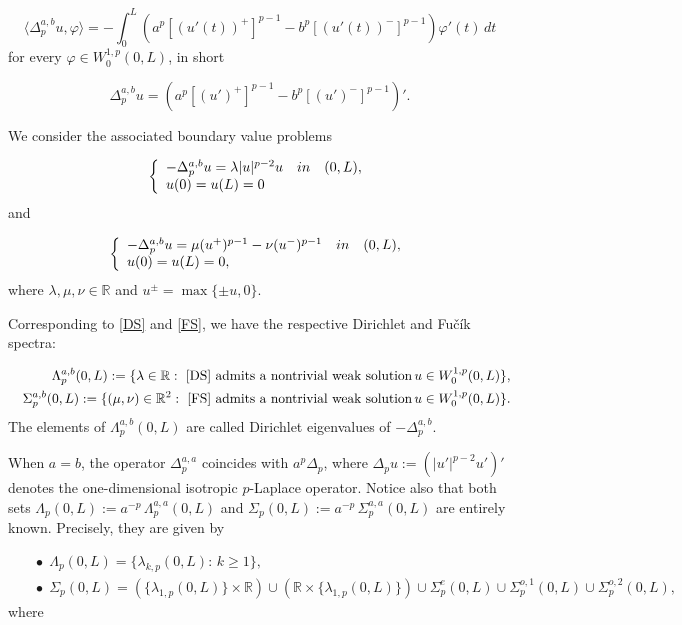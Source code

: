 \documentclass[a4paper,11pt]{article}
\newcommand{\R}{\mathbb{R}}
\begin{document}
{\[
\langle \Delta^{a,b}_p u, \varphi \rangle = - \int_0^L \left(a^{p}[(u'(t))^{+}]^{p-1}-b^{p}[(u'(t))^{-}]^{p-1}\right) \varphi'(t)\, dt
\]
for every $\varphi \in W_0^{1,p}(0,L)$, in short

\[
\Delta^{a,b}_p u = \left(a^{p}[(u')^{+}]^{p-1}-b^{p}[(u')^{-}]^{p-1}\right)'.
\]

We consider the associated boundary value problems

\begin{equation} \label{DS}
\left\{
\begin{array}{lllllrlllr}
- \Delta^{a,b}_p u = \lambda \vert u \vert^{p-2} u & {\rm in} & (0, L), \\
u(0) = u(L) = 0
\end{array}\right.
\end{equation}
and

\begin{equation} \label{FS}
\left\{
\begin{array}{lllllrlllr}
- \Delta^{a,b}_p u = \mu (u^+)^{p-1} - \nu (u^-)^{p-1} & {\rm in} & (0, L), \\
u(0) = u(L) = 0,
\end{array}\right.
\end{equation}
where $\lambda, \mu, \nu \in \R$ and $u^\pm = \max\{\pm u, 0\}$.

Corresponding to \eqref{DS} and \eqref{FS}, we have the respective Dirichlet and Fu\v cík spectra:

\begin{eqnarray*}
&& \Lambda^{a,b}_p(0,L) := \{ \lambda \in \R:\ \eqref{DS}\ \text{admits a nontrivial weak solution}\, u \in W_0^{1,p}(0,L)\}, \\
&& \Sigma^{a,b}_p(0,L) := \{ (\mu, \nu) \in \R^2:\ \eqref{FS}\ \text{admits a nontrivial weak solution}\, u \in W_0^{1,p}(0,L)\}.
\end{eqnarray*}
The elements of $\Lambda^{a,b}_p(0,L)$ are called Dirichlet eigenvalues of $- \Delta^{a,b}_p$.

When $a = b$, the operator $\Delta^{a,a}_p$ coincides with $a^p \Delta_p$, where $\Delta_p u := \left(\vert u' \vert^{p-2} u'\right)'$ denotes the one-dimensional isotropic $p$-Laplace operator. Notice also that both sets $\Lambda_p(0,L):= a^{-p}\, \Lambda^{a,a}_p(0,L)$ and $\Sigma_p(0,L):= a^{-p}\, \Sigma^{a,a}_p(0,L)$ are entirely known. Precisely, they are given by

\begin{eqnarray*}
&& \bullet\ \ \Lambda_p(0,L) = \{ \lambda_{k,p}(0,L):\, k \geq 1\}, \\
&& \bullet\ \ \Sigma_p(0,L) = \left( \{ \lambda_{1,p}(0,L) \} \times \R \right) \cup \left( \R \times \{ \lambda_{1,p}(0,L) \} \right) \cup \Sigma^e_p(0,L) \cup \Sigma^{o,1}_p(0,L) \cup \Sigma^{o,2}_p(0,L),
\end{eqnarray*}
where

}
\end{document}
